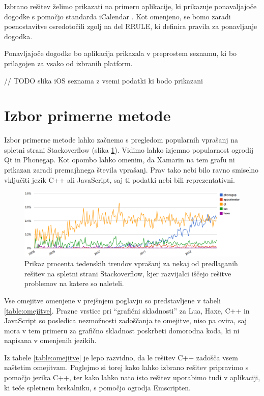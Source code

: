 Izbrano rešitev želimo prikazati na primeru aplikacije, ki prikazuje ponavaljajoče dogodke s pomočjo standarda iCalendar \cite{rfc5545}. Kot omenjeno, se bomo zaradi poenostavitve osredotočili zgolj na del RRULE, ki definira pravila za ponavljanje dogodka.

Ponavljajoče dogodke bo aplikacija prikazala v preprostem seznamu, ki bo prilagojen za vsako od izbranih platform.

// TODO slika iOS seznama z vsemi podatki ki bodo prikazani

\section{Izbor primerne metode}

Izbor primerne metode lahko začnemo s pregledom popularnih vprašanj na spletni strani Stackoverflow (slika \ref{fig:stackoverflow-trends}). Vidimo lahko izjemno popularnost ogrodij Qt in Phonegap. Kot opombo lahko omenim, da Xamarin na tem grafu ni prikazan zaradi premajhnega števila vprašanj. Prav tako nebi bilo ravno smiselno vključiti jezik C++ ali JavaScript, saj ti podatki nebi bili reprezentativni.

\begin{figure}
 \includegraphics[width=\linewidth]{stackoverflow-trends}
 \caption{Prikaz procenta tedenskih trendov vprašanj za nekaj od predlaganih rešitev na spletni strani Stackoverflow, kjer razvijalci iščejo rešitve problemov na katere so naleteli.}
 \label{fig:stackoverflow-trends}
\end{figure}

Vse omejitve omenjene v prejšnjem poglavju so predstavljene v tabeli \ref{table:omejitve}. Prazne vrstice pri ``grafični skladnosti'' za Lua, Haxe, C++ in JavaScript so posledica nezmožnosti zadoščanja te omejitve, niso pa ovira, saj mora v tem primeru za grafično skladnost poskrbeti domorodna koda, ki ni napisana v omenjenih jezikih.

Iz tabele \ref{table:omejitve} je lepo razvidno, da le rešitev C++ zadošča vsem naštetim omejitvam. Poglejmo si torej kako lahko izbrano rešitev pripravimo s pomočjo jezika C++, ter kako lahko nato isto rešitev uporabimo tudi v aplikaciji, ki teče spletnem brskalniku, s pomočjo ogrodja Emscripten.


